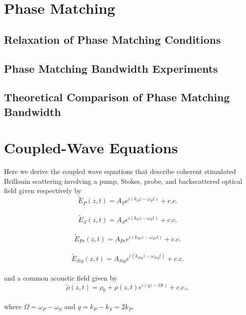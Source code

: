 \documentclass[%
  reprint,
  superscriptaddress,
  amsmath,amssymb,
  aps,
  prapplied,
]{revtex4-2}
\begin{document}
\clearpage
\onecolumngrid

\appendix

\section{Phase Matching}
\subsection{Relaxation of Phase Matching Conditions}
\subsection{Phase Matching Bandwidth Experiments}
\subsection{Theoretical Comparison of Phase Matching Bandwidth}

\section{Coupled-Wave Equations}\label{Appendix:Coupled-Wave Equations}

Here we derive the coupled wave equations that describe coherent stimulated Brillouin scattering involving a pump, Stokes, probe, and backscattered optical field given respectively by
\\
\begin{equation}
    \tilde{E}_{P}(z,t) = A_{P}e^{i(k_{P}z - \omega_{P}t)} + c.c.
    \label{eq:Pump optical field}
\end{equation}
\\
\begin{equation}
    \tilde{E}_{S}(z,t) = A_{S}e^{i(k_{S}z - \omega_{S}t)} + c.c.
    \label{eq:Stokes optical field}
\end{equation}
\\
\begin{equation}
    \tilde{E}_{Pr}(z,t) = A_{Pr}e^{i(k_{Pr}z - \omega_{Pr}t)} + c.c.
    \label{eq:Probe optical field}
\end{equation}
\\
\begin{equation}
    \tilde{E}_{Sig}(z,t) = A_{Sig}e^{i(k_{Sig}z - \omega_{Sig}t)} + c.c.
    \label{eq:Signal optical field}
\end{equation}
\\
\noindent and a common acoustic field given by
\\
\begin{equation}
    \tilde{\rho}(z,t) = \rho_{0} + \rho(z,t)e^{i(qz - \Omega t)} + c.c.,
    \label{eq:acoustic field}
\end{equation}
\\
\noindent where $\Omega = \omega_{P} - \omega_{S}$ and $q = k_{P} - k_{S} = 2k_{P}$.
\end{document}

